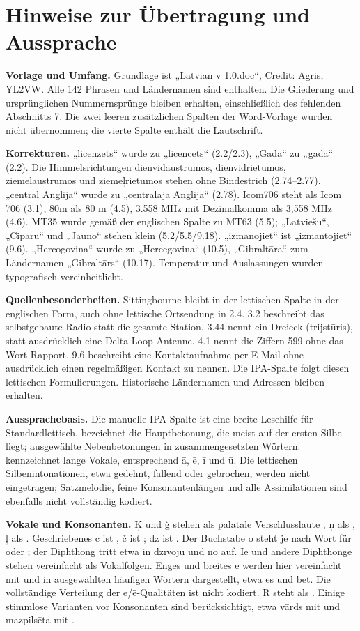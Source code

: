 \documentclass[a4paper,landscape,10pt]{article}
\newcommand{\ipa}[1]{{\ipafont[#1]}}
\begin{document}
\section*{Hinweise zur Übertragung und Aussprache}
\fontsize{8.5}{10}\selectfont\raggedright
\textbf{Vorlage und Umfang.} Grundlage ist „Latvian v 1.0.doc“, Credit: Agris, YL2VW.
Alle 142 Phrasen und Ländernamen sind enthalten. Die Gliederung und ursprünglichen Nummernsprünge
bleiben erhalten, einschließlich des fehlenden Abschnitts 7. Die zwei leeren zusätzlichen Spalten der
Word-Vorlage wurden nicht übernommen; die vierte Spalte enthält die Lautschrift.

\smallskip
\textbf{Korrekturen.} „licenzēts“ wurde zu „licencēts“ (2.2/2.3), „Gada“ zu „gada“ (2.2).
Die Himmelsrichtungen dienvidaustrumos, dienvidrietumos, ziemeļaustrumos und ziemeļrietumos
stehen ohne Bindestrich (2.74--2.77). „centrāl Anglijā“ wurde zu „centrālajā Anglijā“ (2.78).
Icom706 steht als Icom 706 (3.1), 80m als 80 m (4.5), 3.558 MHz mit Dezimalkomma als 3,558 MHz (4.6).
MT35 wurde gemäß der englischen Spalte zu MT63 (5.5); „Latviešu“, „Ciparu“ und „Jauno“
stehen klein (5.2/5.5/9.18). „izmanojiet“ ist „izmantojiet“ (9.6).
„Hercogovina“ wurde zu „Hercegovina“ (10.5), „Gibraltāra“ zum Ländernamen „Gibraltārs“ (10.17).
Temperatur und Auslassungen wurden typografisch vereinheitlicht.

\smallskip
\textbf{Quellenbesonderheiten.} Sittingbourne bleibt in der lettischen Spalte in der englischen Form,
auch ohne lettische Ortsendung in 2.4. 3.2 beschreibt das selbstgebaute Radio statt die gesamte Station.
3.44 nennt ein Dreieck (trijstūris), statt ausdrücklich eine Delta-Loop-Antenne.
4.1 nennt die Ziffern 599 ohne das Wort Rapport.
9.6 beschreibt eine Kontaktaufnahme per E-Mail ohne ausdrücklich einen regelmäßigen Kontakt zu nennen.
Die IPA-Spalte folgt diesen lettischen Formulierungen. Historische Ländernamen und Adressen bleiben erhalten.

\smallskip
\textbf{Aussprachebasis.} Die manuelle IPA-Spalte ist eine breite Lesehilfe für Standardlettisch.
\ipa{ˈ} bezeichnet die Hauptbetonung, die meist auf der ersten Silbe liegt;
\ipa{ˌ} ausgewählte Nebenbetonungen in zusammengesetzten Wörtern.
\ipa{ː} kennzeichnet lange Vokale, entsprechend ā, ē, ī und ū.
Die lettischen Silbenintonationen, etwa gedehnt, fallend oder gebrochen, werden nicht eingetragen;
Satzmelodie, feine Konsonantenlängen und alle Assimilationen sind ebenfalls nicht vollständig kodiert.

\smallskip
\textbf{Vokale und Konsonanten.} Ķ und ģ stehen als palatale Verschlusslaute \ipa{c, ɟ},
ņ als \ipa{ɲ}, ļ als \ipa{ʎ}. Geschriebenes c ist \ipa{ts}, č ist \ipa{tʃ}; dz ist \ipa{dz}.
Der Buchstabe o steht je nach Wort für \ipa{uɔ} oder \ipa{ɔ}; der Diphthong tritt etwa in dzīvoju und no auf.
Ie und andere Diphthonge stehen vereinfacht als Vokalfolgen.
Enges und breites e werden hier vereinfacht mit \ipa{e} und in ausgewählten häufigen Wörtern \ipa{æ}
dargestellt, etwa es und bet. Die vollständige Verteilung der e/ē-Qualitäten ist nicht kodiert.
R steht als \ipa{r}. Einige stimmlose Varianten vor Konsonanten sind berücksichtigt,
etwa vārds mit \ipa{t} und mazpilsēta mit \ipa{s}.
\end{document}

